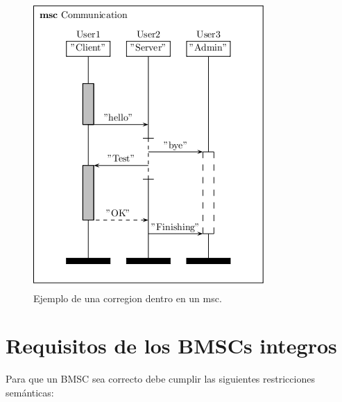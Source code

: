 \begin{figure}
  \centering
  \includegraphics[scale=1]{./images/region.png}
  \caption{Ejemplo de una corregion dentro en un msc.}
  \label{fig:region}
\end{figure}

\section{Requisitos de los BMSCs integros}
Para que un BMSC sea correcto debe cumplir las siguientes
restricciones semánticas:

